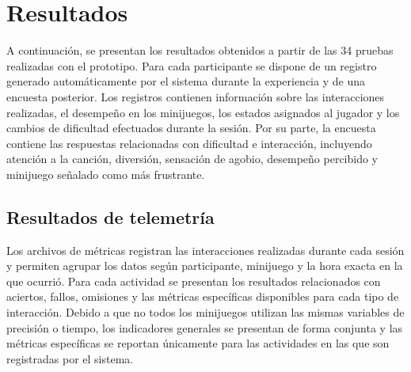 \chapter{Resultados}

A continuación, se presentan los resultados obtenidos a partir de las 34
pruebas realizadas con el prototipo. Para cada participante se dispone de
un registro generado automáticamente por el sistema durante la 
experiencia y de una encuesta posterior. Los registros contienen 
información sobre las interacciones realizadas, el desempeño en los 
minijuegos, los estados asignados al jugador y los cambios de dificultad
efectuados durante la sesión. Por su parte, la encuesta contiene las 
respuestas relacionadas con dificultad e interacción, incluyendo
atención a la canción, diversión, sensación de agobio, desempeño 
percibido y minijuego señalado como más frustrante.

\section{Resultados de telemetría}
Los archivos de métricas registran las interacciones realizadas durante 
cada sesión y permiten agrupar los datos según participante, minijuego y
la hora exacta en la que ocurrió. Para cada actividad se presentan los
resultados relacionados con aciertos, fallos, omisiones y las métricas 
específicas disponibles para cada tipo de interacción. Debido a que no 
todos los minijuegos utilizan las mismas variables de precisión o tiempo, 
los indicadores generales se presentan de forma conjunta y las métricas 
específicas se reportan únicamente para las actividades en las que son 
registradas por el sistema.

